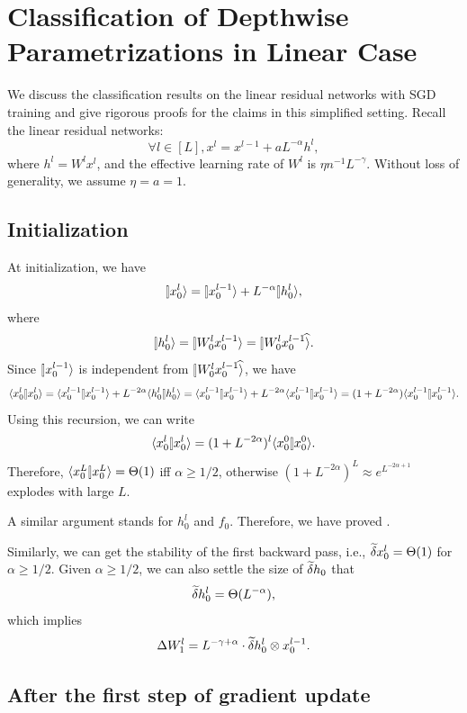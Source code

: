\documentclass{article}
\theoremstyle{plain}
\theoremstyle{definition}
\begin{document}
\fi
\section{Classification of Depthwise Parametrizations in Linear Case}\label{sec:linearsgd_classification}

We discuss the classification results on the linear residual networks with SGD training and give rigorous proofs for the claims in this simplified setting. Recall the linear residual networks:
\[
\forall l \in [L], x^l = x^{l-1} + a L^{-\alpha} h^l, 
\]
where $h^l=W^l x^l$, and the effective learning rate of $W^l$ is $\eta n^{-1} L^{-\gamma}$. Without loss of generality, we assume $\eta=a=1$. 

\subsection{Initialization}
At initialization, we have 
\[
\ket{x_0^l} = \ket{x_0^{l-1}} + L^{-\alpha} \ket{h^l_0},
\]
where \[\ket{h_0^l}=\ket{W_0^l x_0^{l-1}}=\hatket{W_0^l x_0^{l-1}}.\]
Since $\ket{x_0^{l-1}}$ is independent from $\hatket{W_0^l x_0^{l-1}}$,
we have 
\[\braket{x_0^l}{x_0^l} = \braket{x_0^{l-1}}{x_0^{l-1}} + L^{-2\alpha} \braket{h^l_0}{h^l_0} = \braket{x_0^{l-1}}{x_0^{l-1}} + L^{-2\alpha} \braket{x_0^{l-1}}{x_0^{l-1}} =  (1+L^{-2\alpha})\braket{x_0^{l-1}}{x_0^{l-1}}.\]
Using this recursion, we can write 
\[\braket{x_0^l}{x_0^l} = (1+L^{-2\alpha})^l \braket{x_0^0}{x_0^0}.\]
Therefore, $\braket{x_0^L}{x_0^L}=\Theta(1)$ iff $\alpha\geq 1/2$, otherwise $(1+L^{-2\alpha})^L\approx e^{L^{-2\alpha+1}}$ explodes with large $L$.

A similar argument stands for $h^l_0$ and $f_0$. Therefore, we have proved .

Similarly, we can get the stability of the first backward pass, i.e., $\widetilde {\delta} x_0^l=\Theta(1)$ for $\alpha\geq 1/2$. Given $\alpha \geq 1/2$, we can also settle the size of $\widetilde {\delta} h_0$ that
\[\widetilde {\delta} h_0^l = \Theta(L^{-\alpha}), \]
which implies 
\[\Delta W_1^l = L^{-\gamma+\alpha}\cdot \widetilde {\delta}  h_0^l \otimes x_0^{l-1}.\]

\subsection{After the first step of gradient update}
\end{document}
